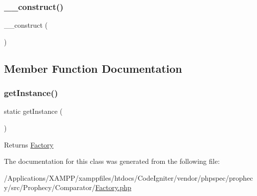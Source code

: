 \subsubsection{\texorpdfstring{\+\_\+\+\_\+construct()}{\_\_construct()}}
{\footnotesize\ttfamily \+\_\+\+\_\+construct (\begin{DoxyParamCaption}{ }\end{DoxyParamCaption})}



\subsection{Member Function Documentation}
\mbox{\label{class_prophecy_1_1_comparator_1_1_factory_ac93fbec81f07e5d15f80db907e63dc10}} 
\subsubsection{\texorpdfstring{get\+Instance()}{getInstance()}}
{\footnotesize\ttfamily static get\+Instance (\begin{DoxyParamCaption}{ }\end{DoxyParamCaption})\hspace{0.3cm}{\ttfamily [static]}}

\begin{DoxyReturn}{Returns}
\mbox{\hyperlink{class_prophecy_1_1_comparator_1_1_factory}{Factory}} 
\end{DoxyReturn}


The documentation for this class was generated from the following file\+:\begin{DoxyCompactItemize}
\item 
/\+Applications/\+X\+A\+M\+P\+P/xamppfiles/htdocs/\+Code\+Igniter/vendor/phpspec/prophecy/src/\+Prophecy/\+Comparator/\mbox{\hyperlink{phpspec_2prophecy_2src_2_prophecy_2_comparator_2_factory_8php}{Factory.\+php}}\end{DoxyCompactItemize}
